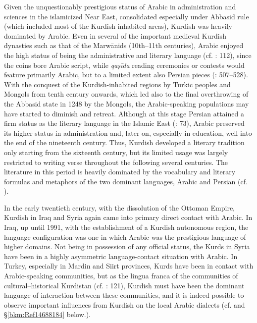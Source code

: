 \documentclass[output=paper]{langsci/langscibook}
\begin{document}
Given the unquestionably prestigious status of Arabic in administration and sciences in the islamicized Near East, consolidated especially under Abbasid rule (which included most of the Kurdish-inhabited areas), Kurdish was heavily dominated by Arabic. Even in several of the important medieval Kurdish dynasties such as that of the Marwānids (10th–11th centuries), Arabic enjoyed the high status of being the administrative and literary language (cf. \citealt{James2007}: 112), since the coins bore Arabic script, while \textit{qaṣīda} reading ceremonies or contests would feature primarily Arabic, but to a limited extent also Persian pieces (\citealt{Ripper2012}: 507–528). With the conquest of the Kurdish-inhabited regions by Turkic peoples and Mongols from tenth century onwards, which led also to the final overthrowing of the Abbasid state in 1248 by the Mongols, the Arabic-speaking populations may have started to diminish and retreat. Although at this stage Persian attained a firm status as the literary language in the Islamic East (\citealt{Perry2012}: 73), Arabic preserved its higher status in administration and, later on, especially in education, well into the end of the nineteenth century. Thus, Kurdish developed a literary tradition only starting from the sixteenth century, but its limited usage was largely restricted to writing verse throughout the following several centuries. The literature in this period is heavily dominated by the vocabulary and literary formulas and metaphors of the two dominant languages, Arabic and Persian (cf. \citealt{Öpenginforthcoming}). 

In the early twentieth century, with the dissolution of the Ottoman Empire, Kurdish in Iraq and Syria again came into primary direct contact with Arabic. In Iraq, up until 1991, with the establishment of a Kurdish autonomous region, the language configuration was one in which Arabic was the prestigious language of higher domains. Not being in possession of any official status, the Kurds in Syria have been in a highly asymmetric language-contact situation with Arabic. In Turkey, especially in Mardin and Siirt provinces, Kurds have been in contact with Arabic-speaking communities, but as the lingua franca of the communities of cultural–historical Kurdistan (cf. \citealt{Edwards1851}: 121), Kurdish must have been the dominant language of interaction between these communities, and it is indeed possible to observe important influences from Kurdish on the local Arabic dialects (cf. \citealt{Jastrow2011Kurdish} and §\ref{bkm:Ref14688184} below.). 
\end{document}
